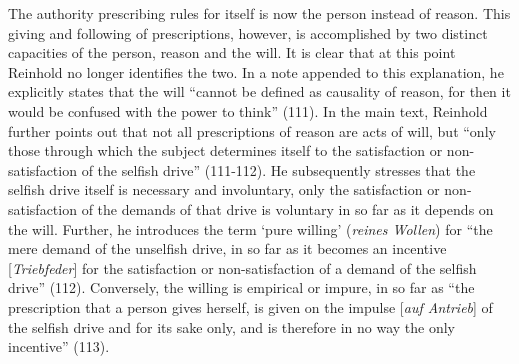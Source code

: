 The authority prescribing rules for itself is now the person instead of reason. This giving and following of prescriptions, however, is accomplished by two distinct capacities of the person, reason and the will. It is clear that at this point Reinhold no longer identifies the two. In a note appended to this explanation, he explicitly states that the will ``cannot be defined as causality of reason, for then it would be confused with the power to think'' (111). In the main text, Reinhold further points out that not all prescriptions of reason are acts of will, but ``only those through which the subject determines itself to the satisfaction or non{-}satisfaction of the selfish drive'' (111{-}112). He subsequently stresses that the selfish drive itself is necessary and involuntary, only the satisfaction or non{-}satisfaction of the demands of that drive is voluntary in so far as it depends on the will. Further, he introduces the term `pure willing' (\textit{reines Wollen}) for ``the mere demand of the unselfish drive, in so far as it becomes an incentive [\textit{Triebfeder}] for the satisfaction or non{-}satisfaction of a demand of the selfish drive'' (112). Conversely, the willing is empirical or impure, in so far as ``the prescription that a person gives herself, is given on the impulse [\textit{auf Antrieb}] of the selfish drive and for its sake only, and is therefore in no way the only incentive'' (113). 

